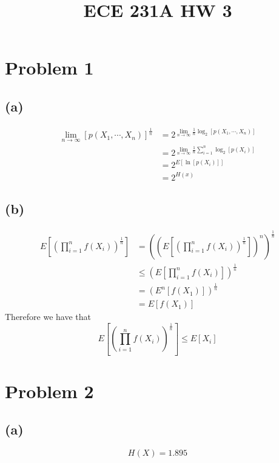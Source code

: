 
\title{ECE 231A HW 3}

\maketitle
\section*{Problem 1}
\subsection*{(a)}
\begin{align*}
    \lim_{n\to\infty}[p(X_1,\cdots,X_n)]^{\frac{1}{n}}&=
        2^{\lim_{n\to\infty}\frac{1}{n}\log_2[p(X_1,\cdots,X_n)]}\\
    &=2^{\lim_{n\to\infty}\frac{1}{n}\sum_{i=1}^n\log_2[p(X_i)]}\\
    &=2^{E[\ln[p(X_i)]]}\\
    &=\boxed{2^{H(x)}}
\end{align*}
\subsection*{(b)}
\begin{align*}
    E\left[\left(\prod_{i=1}^nf(X_i)\right)^{\frac{1}{n}}\right]&=
        \left(\left(E\left[\left(\prod_{i=1}^nf(X_i)\right)^{\frac{1}{n}}\right]\right)^{n}\right)^{\frac{1}{n}}\\
        &\leq \left(E\left[\prod_{i=1}^nf(X_i)\right]\right)^{\frac{1}{n}}\\
        &=\left(E^n[f(X_1)]\right)^{\frac{1}{n}}\\
        &=E[f(X_1)]
\end{align*}
Therefore we have that
$$
    \boxed{E\left[\left(\prod_{i=1}^nf(X_i)\right)^{\frac{1}{n}}\right]\leq E[X_i]}
    $$
\section*{Problem 2}
\subsection*{(a)}
$$H(X)=\boxed{1.895}$$
